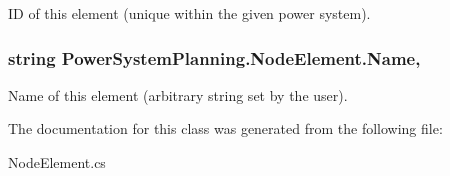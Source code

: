 ID of this element (unique within the given power system). 

\subsubsection[{\texorpdfstring{Name}{Name}}]{\setlength{\rightskip}{0pt plus 5cm}string Power\+System\+Planning.\+Node\+Element.\+Name\hspace{0.3cm}{\ttfamily [get]}, {\ttfamily [set]}}\hypertarget{class_power_system_planning_1_1_node_element_a07a0b254e0ac3b4b97dd45bde0a44291}{}\label{class_power_system_planning_1_1_node_element_a07a0b254e0ac3b4b97dd45bde0a44291}


Name of this element (arbitrary string set by the user). 



The documentation for this class was generated from the following file\+:\begin{DoxyCompactItemize}
\item 
Node\+Element.\+cs\end{DoxyCompactItemize}
